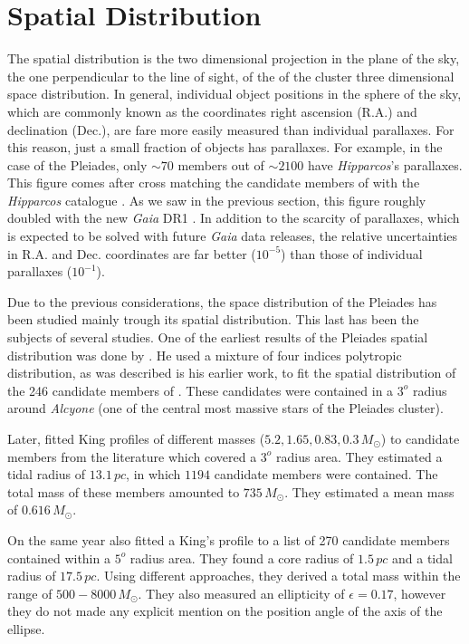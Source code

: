 \section{Spatial Distribution}
The spatial distribution is the two dimensional projection in the plane of the sky, the one perpendicular to the line of sight, of the of the cluster three dimensional space distribution. In general, individual object positions in the sphere of the sky, which are commonly known as the coordinates right ascension (R.A.) and declination (Dec.), are fare more easily measured than individual parallaxes. For this reason, just a small fraction of objects has parallaxes. For example, in the case of the Pleiades, only $\sim70$ members out of $\sim2100$ have \emph{Hipparcos}'s parallaxes. This figure comes after cross matching the candidate members of \citet{Bouy2015} with the \emph{Hipparcos} catalogue \citep{1997A&A...323L..49P}. As we saw in the previous section, this figure roughly doubled with the new \emph{Gaia} DR1 \citep{2016A&A...595A...1G}. In addition to the scarcity of parallaxes, which is expected to be solved with future \emph{Gaia} data releases, the relative uncertainties in R.A. and Dec. coordinates are far better ($10^{-5}$) than those of individual parallaxes ($10^{-1}$).

Due to the previous considerations, the space distribution of the Pleiades has been studied mainly trough its spatial distribution.
This last has been the subjects of several studies. One of the earliest results of the Pleiades spatial distribution was done by \citet{Limber1962}. He used a mixture of four indices polytropic distribution, as was described is his earlier \citet{Limber1961} work, to fit the spatial distribution of the 246 candidate members of \citet{Trumpler1921}. These candidates were contained in a $3^o$ radius around \emph{Alcyone} (one of the central most massive stars of the Pleiades cluster). 

\sloppy
Later, \citet{Pinfield1998} fitted King profiles \citep{King1962} of different masses ($5.2,1.65,0.83,0.3 \,M_{\odot}$) to candidate members from the literature which covered a $3^o$ radius area. They estimated a tidal radius of $13.1\,pc$, in which $1194$ candidate members were contained. The total mass of these members amounted to $735\,M_{\odot}$. They estimated a mean mass of $0.616\,M_{\odot}$. 

On the same year \citet{Raboud1998} also fitted a King's profile \citep{King1962} to a list of 270 candidate members contained within a $5^o$ radius area. They found a core radius of $1.5\,pc$ and a tidal radius of $17.5\,pc$. Using different approaches, they derived a total mass within the range of $500 -8000 \,M_{\odot}$. They also measured an ellipticity of $\epsilon=0.17$, however they do not made any explicit mention on the position angle of the axis of the ellipse.

